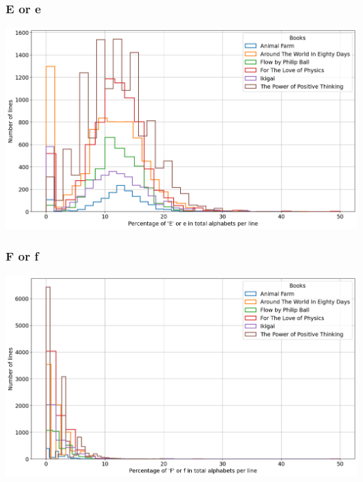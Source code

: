 \begin{frame}
    \frametitle{E or e}
    \begin{center}
        \hspace*{-5ex}
        \includegraphics[scale=0.35]{../01_programFiles/histograms/e.png}\hspace{10ex}
    \end{center}
\end{frame}

\begin{frame}
    \frametitle{F or f}
    \begin{center}
        \hspace*{-5ex}
        \includegraphics[scale=0.35]{../01_programFiles/histograms/f.png}\hspace{10ex}
    \end{center}
\end{frame}

